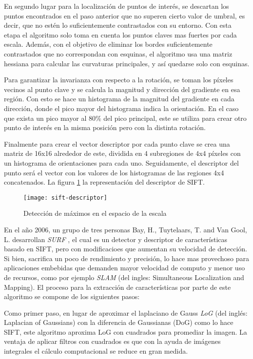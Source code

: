 En segundo lugar para la localización de puntos de interés, se descartan los puntos encontrados en el paso anterior que no superen cierto valor de umbral, es decir, que no estén lo suficientemente contrastados con su entorno. Con esta etapa el algoritmo solo toma en cuenta los puntos claves mas fuertes por cada escala. Además, con el objetivo de eliminar los bordes suficientemente contrastados que no correspondan con esquinas, el algoritmo usa una matriz hessiana para calcular las curvaturas principales, y así quedarse solo con esquinas.

Para garantizar la invarianza con respecto a la rotación, se toman los píxeles vecinos al punto clave y se calcula la magnitud y dirección del gradiente en esa región. Con esto se hace un histograma de la magnitud del gradiente en cada dirección, donde el pico mayor del histograma indica la orientación. En el caso que exista un pico mayor al 80\% del pico principal, este se utiliza para crear otro punto de interés en la misma posición pero con la distinta rotación.

Finalmente para crear el vector descriptor por cada punto clave se crea una matriz de 16x16 alrededor de este, dividida en 4 subregiones de 4x4 píxeles con un histograma de orientaciones para cada uno. Seguidamente, el descriptor del punto será el vector con los valores de los histogramas de las regiones 4x4 concatenados. La figura \ref{imagen:descriptor} la representación del descriptor de SIFT.

\begin{figure}[H]
	\centering
	\texttt{[image: sift-descriptor]}
	\caption[SIFT - Espacio de escalas]{Detección de máximos en el espacio de la escala}
	\label{imagen:descriptor}
\end{figure}


En el año 2006, un grupo de tres  personas Bay, H., Tuytelaars, T. and Van Gool, L. desarrollan \textit{SURF} \cite{surf}, el cual es un detector y descriptor de características basado en SIFT, pero con modificacioes que aumentan su velocidad de detección. Si bien, sacrifica un poco de rendimiento y precisión, lo hace mas provechoso para aplicaciones embebidas que demanden mayor velocidad de computo y menor uso de recursos, como por ejemplo \textit{SLAM} (del ingles: Simultaneous Localization and Mapping). El proceso para la extracción de características por parte de este algoritmo se compone de los siguientes pasos:

Como primer paso, en lugar de aproximar el laplaciano de Gauss \textit{LoG} (del inglés: Laplacian of Gaussians) con la diferencia de Gaussianas (DoG) como lo hace SIFT, este algoritmo aproxima LoG con cuadrados para promediar la imagen. La ventaja de aplicar filtros con cuadrados es que con la ayuda de imágenes integrales el cálculo computacional se reduce en gran medida.

